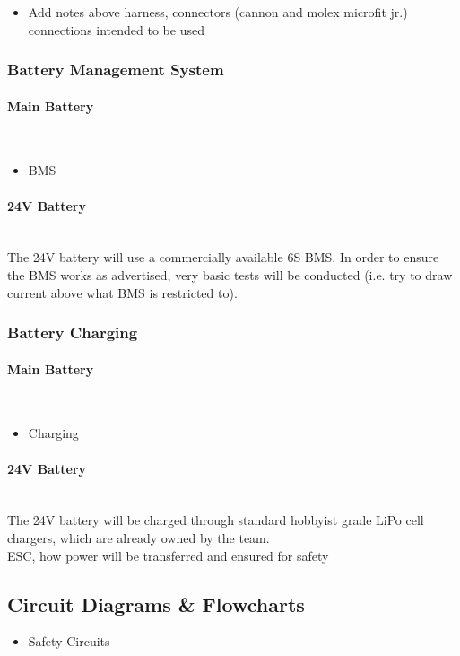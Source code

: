 \documentclass{report}
\let\oldparagraph\paragraph
\renewcommand{\paragraph}[1]{\oldparagraph{#1}\mbox{}\\}
\begin{document}
    \begin{itemize}
        \item Add notes above harness, connectors (cannon and molex microfit jr.) connections intended to be used
    \end{itemize}
    
    \subsubsection{Battery Management System}
    \paragraph{Main Battery}
    \begin{itemize}
        \item BMS
    \end{itemize}
    
    \paragraph{24V Battery}
    The 24V battery will use a commercially available 6S BMS. In order to ensure the BMS works as advertised, very basic tests will be conducted (i.e. try to draw current above what BMS is restricted to).
    \subsubsection{Battery Charging}
    \paragraph{Main Battery}
    \begin{itemize}
        \item Charging
    \end{itemize}
    \paragraph{24V Battery}
    The 24V battery will be charged through standard hobbyist grade LiPo cell chargers, which are already owned by the team.\\
    
    ESC, how power will be transferred and ensured for safety
    
    \subsection{Circuit Diagrams \& Flowcharts}
    \begin{itemize}
        \item Safety Circuits
    \end{itemize}
\end{document}
